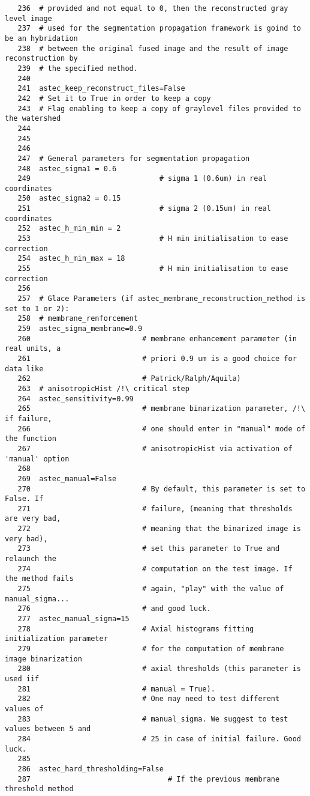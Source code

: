 \begin{verbatim}
   236	# provided and not equal to 0, then the reconstructed gray level image
   237	# used for the segmentation propagation framework is goind to be an hybridation 
   238	# between the original fused image and the result of image reconstruction by
   239	# the specified method.
   240	
   241	astec_keep_reconstruct_files=False 
   242	# Set it to True in order to keep a copy
   243	# Flag enabling to keep a copy of graylevel files provided to the watershed
   244	
   245	
   246	
   247	# General parameters for segmentation propagation
   248	astec_sigma1 = 0.6  		
   249	                            # sigma 1 (0.6um) in real coordinates
   250	astec_sigma2 = 0.15 		
   251	                            # sigma 2 (0.15um) in real coordinates
   252	astec_h_min_min = 2    		
   253	                            # H min initialisation to ease correction
   254	astec_h_min_max = 18   		
   255	                            # H min initialisation to ease correction
   256	
   257	# Glace Parameters (if astec_membrane_reconstruction_method is set to 1 or 2):
   258	# membrane_renforcement
   259	astec_sigma_membrane=0.9
   260	                        # membrane enhancement parameter (in real units, a
   261							# priori 0.9 um is a good choice for data like 
   262							# Patrick/Ralph/Aquila)
   263	# anisotropicHist /!\ critical step
   264	astec_sensitivity=0.99  
   265	                        # membrane binarization parameter, /!\ if failure,
   266							# one should enter in "manual" mode of the function
   267							# anisotropicHist via activation of 'manual' option
   268	
   269	astec_manual=False     	
   270	                        # By default, this parameter is set to False. If 
   271							# failure, (meaning that thresholds are very bad, 
   272							# meaning that the binarized image is very bad),
   273					 		# set this parameter to True and relaunch the 
   274					 		# computation on the test image. If the method fails
   275					 		# again, "play" with the value of manual_sigma... 
   276					 		# and good luck.
   277	astec_manual_sigma=15   
   278	                        # Axial histograms fitting initialization parameter 
   279							# for the computation of membrane image binarization
   280							# axial thresholds (this parameter is used iif 
   281							# manual = True).
   282							# One may need to test different values of 
   283							# manual_sigma. We suggest to test values between 5 and
   284							# 25 in case of initial failure. Good luck.
   285	
   286	astec_hard_thresholding=False 
   287	                              # If the previous membrane threshold method 

\end{verbatim}
